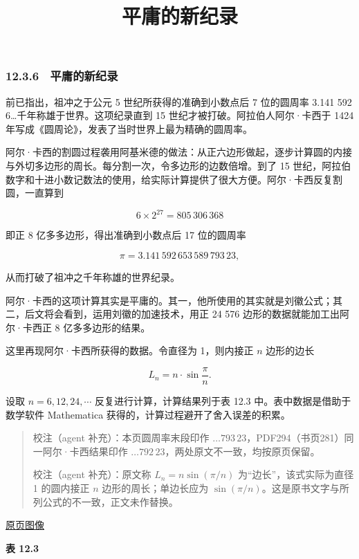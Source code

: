 \documentclass[
  10pt,
  fontset=fandol]{ctexart}
\title{平庸的新纪录}
\author{}
\date{}
\begin{document}
\maketitle

\subsubsection{12.3.6　平庸的新纪录}\label{ux5e73ux5eb8ux7684ux65b0ux7eaaux5f55}

前已指出，祖冲之于公元 5 世纪所获得的准确到小数点后 7 位的圆周率 3.141 592 6\ldots 千年称雄于世界。这项纪录直到 15 世纪才被打破。阿拉伯人阿尔·卡西于 1424 年写成《圆周论》，发表了当时世界上最为精确的圆周率。

阿尔·卡西的割圆过程袭用阿基米德的做法：从正六边形做起，逐步计算圆的内接与外切多边形的周长。每分割一次，令多边形的边数倍增。到了 15 世纪，阿拉伯数字和十进小数记数法的使用，给实际计算提供了很大方便。阿尔·卡西反复割圆，一直算到

\[
6\times2^{27}=805\,306\,368
\]

即正 8 亿多多边形，得出准确到小数点后 17 位的圆周率

\[
\pi=3.141\,592\,653\,589\,793\,23,
\]

从而打破了祖冲之千年称雄的世界纪录。

阿尔·卡西的这项计算其实是平庸的。其一，他所使用的其实就是刘徽公式；其二，后文将会看到，运用刘徽的加速技术，用正 24 576 边形的数据就能加工出阿尔·卡西正 8 亿多多边形的结果。

这里再现阿尔·卡西所获得的数据。令直径为 1，则内接正 \(n\) 边形的边长

\[
L_n=n\cdot\sin\frac{\pi}{n}.
\]

设取 \(n=6,12,24,\cdots\) 反复进行计算，计算结果列于表 12.3 中。表中数据是借助于数学软件 Mathematica 获得的，计算过程避开了舍入误差的积累。

\begin{quote}
校注（agent 补充）：本页圆周率末段印作 \(\ldots793\,23\)，PDF294（书页281）同一阿尔·卡西结果印作 \(\ldots792\,23\)，两处原文不一致，均按原页保留。

校注（agent 补充）：原文称 \(L_n=n\sin(\pi/n)\) 为``边长''，该式实际为直径 1 的圆内接正 \(n\) 边形的周长；单边长应为 \(\sin(\pi/n)\)。这是原书文字与所列公式的不一致，正文未作替换。
\end{quote}

\href{../../source-images/pdf-303.jpeg}{原页图像}

\textbf{表 12.3}
\end{document}
